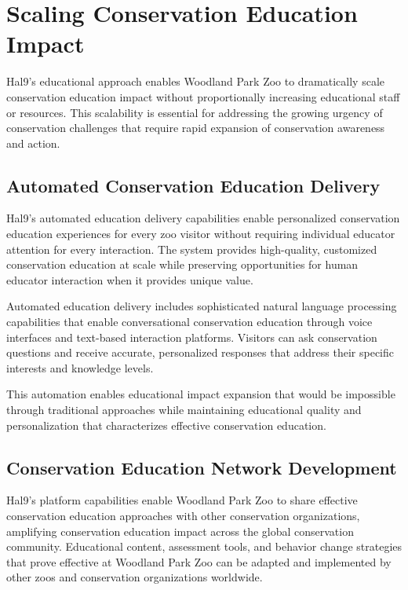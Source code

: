 \documentclass[
  Letterpaper,
]{scrbook}
\begin{document}
\section{Scaling Conservation Education
Impact}\label{scaling-conservation-education-impact}

Hal9's educational approach enables Woodland Park Zoo to dramatically
scale conservation education impact without proportionally increasing
educational staff or resources. This scalability is essential for
addressing the growing urgency of conservation challenges that require
rapid expansion of conservation awareness and action.

\subsection{Automated Conservation Education
Delivery}\label{automated-conservation-education-delivery}

Hal9's automated education delivery capabilities enable personalized
conservation education experiences for every zoo visitor without
requiring individual educator attention for every interaction. The
system provides high-quality, customized conservation education at scale
while preserving opportunities for human educator interaction when it
provides unique value.

Automated education delivery includes sophisticated natural language
processing capabilities that enable conversational conservation
education through voice interfaces and text-based interaction platforms.
Visitors can ask conservation questions and receive accurate,
personalized responses that address their specific interests and
knowledge levels.

This automation enables educational impact expansion that would be
impossible through traditional approaches while maintaining educational
quality and personalization that characterizes effective conservation
education.

\subsection{Conservation Education Network
Development}\label{conservation-education-network-development}

Hal9's platform capabilities enable Woodland Park Zoo to share effective
conservation education approaches with other conservation organizations,
amplifying conservation education impact across the global conservation
community. Educational content, assessment tools, and behavior change
strategies that prove effective at Woodland Park Zoo can be adapted and
implemented by other zoos and conservation organizations worldwide.
\end{document}
